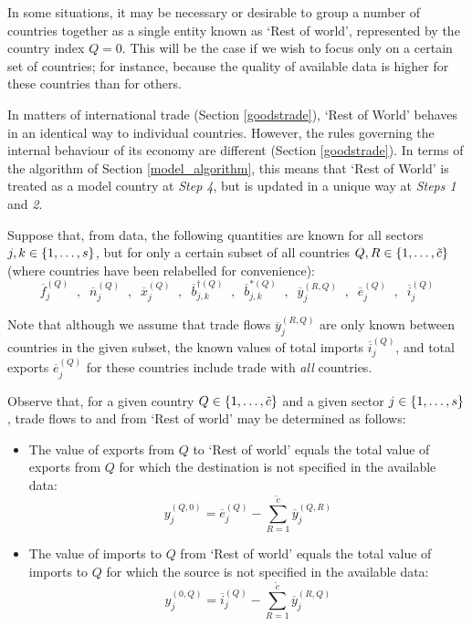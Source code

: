 \documentclass[preprint,authoryear,3p]{elsarticle}
\begin{document}
In some situations, it may be necessary or desirable to group a number of countries together as a single entity known as `Rest of world', represented by the country index $Q=0$. This will be the case if we wish to focus only on a certain set of countries; for instance, because the quality of available data is higher for these countries than for others.

In matters of international trade (Section \ref{goodstrade}), `Rest of World' behaves in an identical way to individual countries. However, the rules governing the internal behaviour of its economy are different (Section \ref{goodstrade}). In terms of the algorithm of Section \ref{model_algorithm}, this means that `Rest of World' is treated as a model country at \textit{Step 4}, but is updated in a unique way at \textit{Steps 1} and \textit{2}.

Suppose that, from data, the following quantities are known for all sectors $j,k \in \{1, \mathellipsis, s \}$, but for only a certain subset of all countries $Q,R \in \{1, \mathellipsis, \tilde{c} \}$ (where countries have been relabelled for convenience):
$$
\overline{f}^{(Q)}_j \; \; , \; \; \overline{n}^{(Q)}_j \; \; , \; \; \overline{x}^{(Q)}_j \; \; , \; \; \overline{b}^{\dag (Q)}_{j,k} \; \; , \; \; \overline{b}^{* (Q)}_{j,k} \; \; , \; \; \overline{y}^{(R,Q)}_{j} \; \; , \; \; \overline{e}^{(Q)}_j \; \; , \; \; \overline{i}^{(Q)}_j
$$

Note that although we assume that trade flows $\overline{y}^{(R,Q)}_{j}$ are only known between countries in the given subset, the known values of total imports $\overline{i}^{(Q)}_j$, and total exports $\overline{e}^{(Q)}_j$ for these countries include trade with \textit{all} countries.

Observe that, for a given country $Q \in \{1, \mathellipsis, \tilde{c} \}$ and a given sector $j \in \{1, \mathellipsis, s \}$, trade flows to and from `Rest of world' may be determined as follows:

\begin{itemize}
\item The value of exports from $Q$ to `Rest of world' equals the total value of exports from $Q$ for which the destination is not specified in the available data:
$$
y^{ \left( Q,0 \right) }_{j} = \overline{e}^{(Q)}_j - \sum_{R=1}^{\tilde{c}} \overline{y}^{(Q,R)}_{j}
$$
\item The value of imports to $Q$ from `Rest of world' equals the total value of imports to $Q$ for which the source is not specified in the available data:
$$
y^{ \left( 0,Q \right) }_{j} = \overline{i}^{(Q)}_j - \sum_{R=1}^{\tilde{c}} \overline{y}^{(R,Q)}_{j}
$$
\end{itemize}
\end{document}
